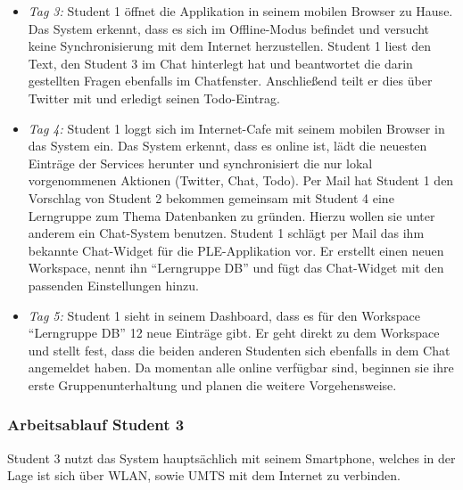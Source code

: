 \begin{itemize}
 \item \emph{Tag 3:} Student 1 öffnet die Applikation in seinem mobilen Browser zu Hause. Das System erkennt, dass es sich im Offline-Modus befindet und versucht keine Synchronisierung mit dem Internet herzustellen. Student 1 liest den Text, den Student 3 im Chat hinterlegt hat und beantwortet die darin gestellten Fragen ebenfalls im Chatfenster. Anschließend teilt er dies über Twitter mit und erledigt seinen Todo-Eintrag.
 \item \emph{Tag 4:} Student 1 loggt sich im Internet-Cafe mit seinem mobilen Browser in das System ein. Das System erkennt, dass es online ist, lädt die neuesten Einträge der Services herunter und synchronisiert die nur lokal vorgenommenen Aktionen (Twitter, Chat, Todo). Per Mail hat Student 1 den Vorschlag von Student 2 bekommen gemeinsam mit Student 4 eine Lerngruppe zum Thema Datenbanken zu gründen. Hierzu wollen sie unter anderem ein Chat-System benutzen. Student 1 schlägt per Mail das ihm bekannte Chat-Widget für die PLE-Applikation vor. Er erstellt einen neuen Workspace, nennt ihn “Lerngruppe DB” und fügt das Chat-Widget mit den passenden Einstellungen hinzu.
 \item \emph{Tag 5:} Student 1 sieht in seinem Dashboard, dass es für den Workspace “Lerngruppe DB” 12 neue Einträge gibt. Er geht direkt zu dem Workspace und stellt fest, dass die beiden anderen Studenten sich ebenfalls in dem Chat angemeldet haben. Da momentan alle online verfügbar sind, beginnen sie ihre erste Gruppenunterhaltung und planen die weitere Vorgehensweise.
\end{itemize}

\subsubsection*{Arbeitsablauf Student 3}
Student 3 nutzt das System hauptsächlich mit seinem Smartphone, welches in der Lage ist sich über WLAN, sowie UMTS mit dem Internet zu verbinden.

